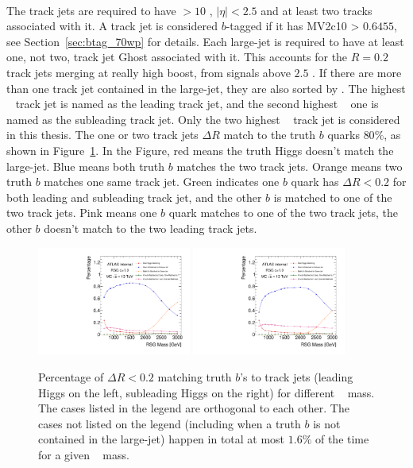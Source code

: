 \paragraph{}
The track jets are required to have \pt $> 10$ \GeV, $|\eta| < 2.5$ and at least two tracks associated with it. 
A track jet is considered $b$-tagged if it has MV2c10 > $0.6455$, see Section~\ref{sec:btag_70wp} for details. 
Each large-\R jet is required to have at least one, not two, track jet Ghost associated with it.
This accounts for the $R=0.2$ track jets merging at really high boost, from signals above $2.5$ \TeV.
If there are more than one track jet contained in the large-\R jet, they are also sorted by \pt.
The highest \pt~ track jet is named as the leading track jet, and the second highest \pt~ one is named as the subleading track jet.
Only the two highest \pt~ track jet is considered in this thesis.
The one or two track jets $\Delta R$ match to the truth $b$ quarks $80\%$, as shown in Figure~\ref{fig:truth-bmatch}. 
In the Figure, red means the truth Higgs doesn't match the large-\R jet. Blue means both truth $b$ matches the two track jets. Orange means two truth $b$ matches one same track jet. Green indicates one $b$ quark has $\Delta R<0.2$ for both leading and subleading track jet, and the other $b$ is matched to one of the two track jets. Pink means one $b$ quark matches to one of the two track jets, the other $b$ doesn't match to the two leading track jets.

\begin{figure}[htbp!]
\begin{center}
  \includegraphics[width=0.45\textwidth,angle=-90]{figures/boosted/Truth/truth_b-matching.pdf}
  \includegraphics[width=0.45\textwidth,angle=-90]{figures/boosted/Truth/truth_b-matching-sublead.pdf}
\caption{Percentage of $\Delta R<0.2$ matching truth $b$'s to track jets (leading Higgs on the left, subleading Higgs on the right) for different \Grav~ mass. The cases listed in the legend are orthogonal to each other. The cases not listed on the legend (including when a truth $b$ is not contained in the large-\R jet) happen in total at most $1.6\%$ of the time for a given \Grav~ mass.}
\label{fig:truth-bmatch}
\end{center}
\end{figure}

